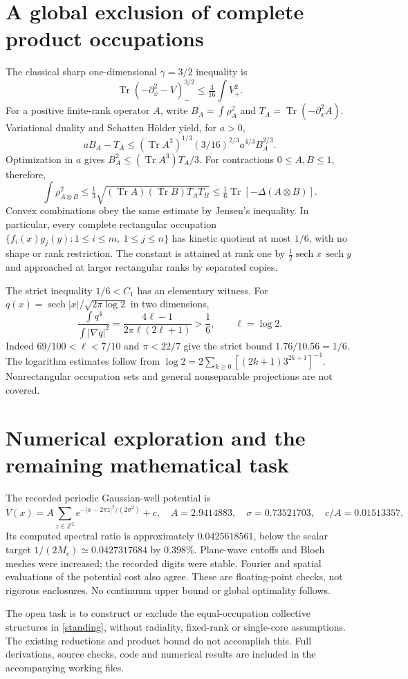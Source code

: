 \documentclass[11pt]{article}
\newcommand{\Tr}{\operatorname{Tr}}
\begin{document}
\section{A global exclusion of complete product occupations}
The classical sharp one-dimensional $\gamma=3/2$ inequality is
\[
 \Tr(-\partial_x^2-V)_-^{3/2}\le\tfrac3{16}\int V_+^2.
\]
For a positive finite-rank operator $A$, write
$B_A=\int\rho_A^2$ and $T_A=\Tr(-\partial_x^2A)$.
Variational duality and Schatten H\"older yield, for $a>0$,
\[
 aB_A-T_A\le
 (\Tr A^3)^{1/3}(3/16)^{2/3}a^{4/3}B_A^{2/3}.
\]
Optimization in $a$ gives $B_A^2\le(\Tr A^3)T_A/3$.
For contractions $0\le A,B\le1$, therefore,
\[
 \int\rho_{A\otimes B}^2
 \le\tfrac13\sqrt{(\Tr A)(\Tr B)T_AT_B}
 \le\tfrac16\Tr[-\Delta(A\otimes B)].
\]
Convex combinations obey the same estimate by Jensen's inequality.
In particular, every complete rectangular occupation
$\{f_i(x)g_j(y):1\le i\le m,\ 1\le j\le n\}$
has kinetic quotient at most $1/6$, with no shape or rank restriction.
The constant is attained at rank one by
$\frac12\operatorname{sech}x\,\operatorname{sech}y$ and approached
at larger rectangular ranks by separated copies.

The strict inequality $1/6<C_1$ has an elementary witness.
For $q(x)=\operatorname{sech}|x|/\sqrt{2\pi\log2}$ in two dimensions,
\[
 \frac{\int q^4}{\int|\nabla q|^2}
 =\frac{4\ell-1}{2\pi\ell(2\ell+1)}>\frac16,\qquad \ell=\log2.
\]
Indeed $69/100<\ell<7/10$ and $\pi<22/7$ give the strict bound
$1.76/10.56=1/6$. The logarithm estimates follow from
$\log2=2\sum_{k\ge0}[(2k+1)3^{2k+1}]^{-1}$.
Nonrectangular occupation sets and general nonseparable projections
are not covered.

\section{Numerical exploration and the remaining mathematical task}
The recorded periodic Gaussian-well potential is
\[
 V(x)=A\sum_{z\in\mathbb Z^2}
 e^{-|x-2\pi z|^2/(2\sigma^2)}+c,
 \quad A=2.9414883,\quad \sigma=0.73521703,\quad c/A=0.01513357.
\]
Its computed spectral ratio is approximately $0.0425618561$,
below the scalar target $1/(2M_c)\simeq0.0427317684$ by $0.398\%$.
Plane-wave cutoffs and Bloch meshes were increased; the recorded digits
were stable. Fourier and spatial evaluations of the potential cost
also agree. These are floating-point checks, not rigorous enclosures.
No continuum upper bound or global optimality follows.

The open task is to construct or exclude the equal-occupation collective
structures in \eqref{standing}, without radiality, fixed-rank or
single-core assumptions. The existing reductions and product bound
do not accomplish this. Full derivations, source checks, code and
numerical results are included in the accompanying working files.
\end{document}
